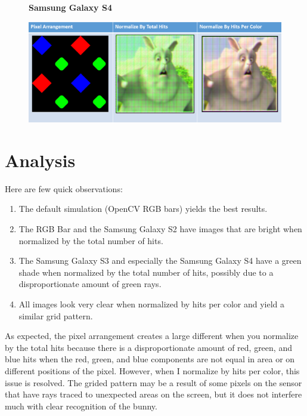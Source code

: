 \begin{figure}
    \centering
    \textbf{Samsung Galaxy S4}\par\medskip
    \includegraphics[width=6in]{chapters/chapter7/images/Samsung_Galaxy_S4.png}
\end{figure}

\newpage
\section{Analysis}

Here are few quick observations:
\begin{enumerate}
\item The default simulation (OpenCV RGB bars) yields the best results.

\item The RGB Bar and the Samsung Galaxy S2 have images that are bright when normalized by the total number of hits. 

\item The Samsung Galaxy S3 and especially the Samsung Galaxy S4 have a green shade when normalized by the total number of hits, possibly due to a disproportionate amount of green rays.

\item All images look very clear when normalized by hits per color and yield a similar grid pattern.
\end{enumerate}

As expected, the pixel arrangement creates a large different when you normalize by the total hits because there is a disproportionate amount of red, green, and blue hits when the red, green, and blue components are not equal in area or on different positions of the pixel. However, when I normalize by hits per color, this issue is resolved. The grided pattern may be a result of some pixels on the sensor that have rays traced to unexpected areas on the screen, but it does not interfere much with clear recognition of the bunny.